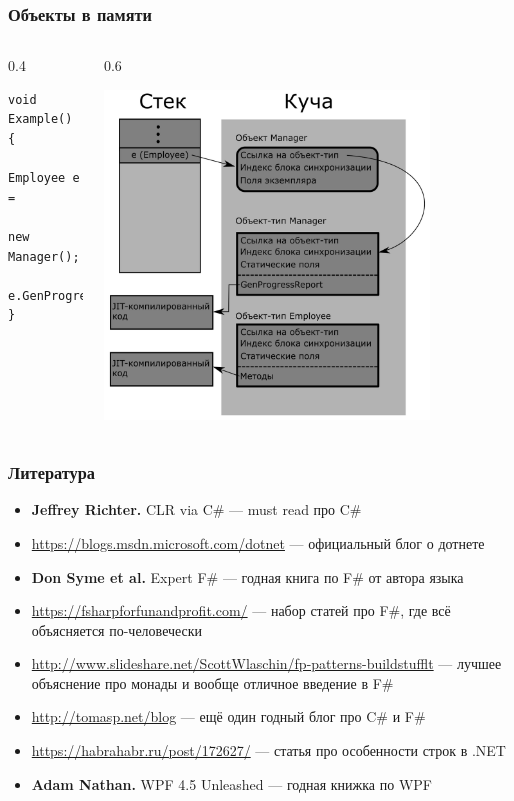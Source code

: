 \documentclass[xetex,mathserif,serif]{beamer}
\begin{document}
\begin{frame}[fragile]
	\frametitle{Объекты в памяти}
	\begin{columns}
		\begin{column}{0.4\textwidth}
			\begin{verbatim}
void Example() 
{
    Employee e = 
        new Manager();
    e.GenProgressReport();
}
			\end{verbatim}
		\end{column}
		\begin{column}{0.6\textwidth}
			\begin{center}
				\includegraphics[width=0.8\textwidth]{objectInMemory.png}
			\end{center}
		\end{column}
	\end{columns}
\end{frame}

\begin{frame}
	\frametitle{Литература}
	\begin{itemize}
		\item \textbf{Jeffrey Richter.} CLR via C\# --- must read про C\#
		\item \url{https://blogs.msdn.microsoft.com/dotnet} --- официальный блог о дотнете
		\item \textbf{Don Syme et al.} Expert F\# --- годная книга по F\# от автора языка
		\item \url{https://fsharpforfunandprofit.com/} --- набор статей про F\#, где всё объясняется по-человечески
		\item \url{http://www.slideshare.net/ScottWlaschin/fp-patterns-buildstufflt} --- лучшее объяснение про монады и вообще отличное введение в F\#
		\item \url{http://tomasp.net/blog} --- ещё один годный блог про C\# и F\#
		\item \url{https://habrahabr.ru/post/172627/} --- статья про особенности строк в .NET
		\item \textbf{Adam Nathan.} WPF 4.5 Unleashed --- годная книжка по WPF
	\end{itemize}
\end{frame}
\end{document}
